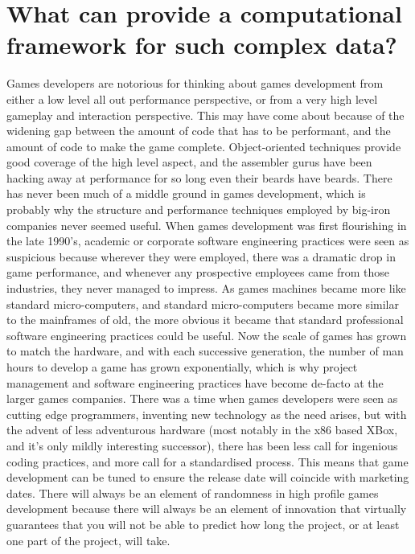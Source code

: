 \section[The framework]{What can provide a computational framework for such
complex data?}

Games developers are notorious for thinking about games development from either
a low level all out performance perspective, or from a very high level gameplay
and interaction perspective. This may have come about because of the widening
gap between the amount of code that has to be performant, and the amount of
code to make the game complete. Object-oriented techniques provide good
coverage of the high level aspect, and the assembler gurus have been hacking
away at performance for so long even their beards have beards. There has never
been much of a middle ground in games development, which is probably why the
structure and performance techniques employed by big-iron companies never
seemed useful. When games development was first flourishing in the late 1990's,
academic or corporate software engineering practices were seen as suspicious
because wherever they were employed, there was a dramatic drop in game
performance, and whenever any prospective employees came from those industries,
they never managed to impress. As games machines became more like standard
micro-computers, and standard micro-computers became more similar to the
mainframes of old, the more obvious it became that standard professional
software engineering practices could be useful. Now the scale of games has
grown to match the hardware, and with each successive generation, the number of
man hours to develop a game has grown exponentially, which is why project
management and software engineering practices have become de-facto at the
larger games companies. There was a time when games developers were seen as
cutting edge programmers, inventing new technology as the need arises, but with
the advent of less adventurous hardware (most notably in the x86 based XBox,
and it's only mildly interesting successor), there has been less call for
ingenious coding practices, and more call for a standardised process. This
means that game development can be tuned to ensure the release date will
coincide with marketing dates. There will always be an element of randomness in
high profile games development because there will always be an element of
innovation that virtually guarantees that you will not be able to predict how
long the project, or at least one part of the project, will take.

